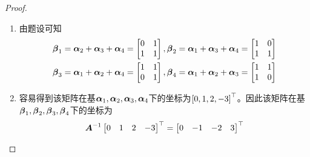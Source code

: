 \begin{proof}
    \begin{enumerate}
        \item {
              由题设可知
              \begin{align*}
                  \boldsymbol{\beta}_1 & =\boldsymbol{\alpha}_2+\boldsymbol{\alpha}_3+\boldsymbol{\alpha}_4=\begin{bmatrix}0&1\\1&1\end{bmatrix},
                  \boldsymbol{\beta}_2=\boldsymbol{\alpha}_1+\boldsymbol{\alpha}_3+\boldsymbol{\alpha}_4=\begin{bmatrix}1&0\\1&1\end{bmatrix}     \\
                  \boldsymbol{\beta}_3 & =\boldsymbol{\alpha}_1+\boldsymbol{\alpha}_2+\boldsymbol{\alpha}_4=\begin{bmatrix}1&1\\0&1\end{bmatrix},
                  \boldsymbol{\beta}_4=\boldsymbol{\alpha}_1+\boldsymbol{\alpha}_2+\boldsymbol{\alpha}_3=\begin{bmatrix}1&1\\1&0\end{bmatrix}
              \end{align*}
              }
        \item {
              容易得到该矩阵在基\(\boldsymbol{\alpha}_1,\boldsymbol{\alpha}_2,\boldsymbol{\alpha}_3,\boldsymbol{\alpha}_4\)下的坐标为\(\left[ 0,1,2,-3 \right]^\top\)。因此该矩阵在基\(\boldsymbol{\beta}_1,\boldsymbol{\beta}_2,\boldsymbol{\beta}_3,\boldsymbol{\beta}_4\)下的坐标为
              \begin{equation*}
                  {\boldsymbol{A}}^{-1}\begin{bmatrix}0&1&2&-3\end{bmatrix}^\top=\begin{bmatrix}0&-1&-2&3\end{bmatrix}^\top
              \end{equation*}
              }
    \end{enumerate}
\end{proof}

